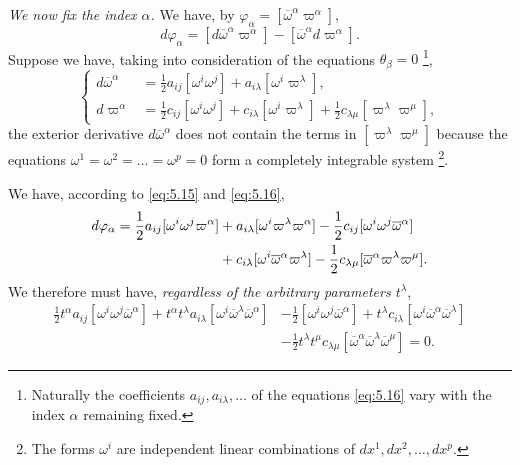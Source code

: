 \emph{We now fix the index $\alpha$.} We have, by $\varphi_{\alpha}=[\overline\omega^{\alpha}\varpi^{\alpha}]$,
\begin{equation}
  \label{eq:5.15}
  d\varphi_{\alpha}=[d\overline\omega^{\alpha}\varpi^{\alpha}]-[\overline\omega^{\alpha}d\varpi^{\alpha}].
\end{equation}
Suppose we have, taking into consideration of the equations $\theta_{\beta}=0$ \footnote{Naturally the coefficients $a_{ij},a_{i\lambda},\dots$ of the equations \eqref{eq:5.16} vary with the index $\alpha$ remaining fixed.},
\begin{equation}
  \label{eq:5.16}
  \left\{
    \begin{aligned}
      d\overline\omega^{\alpha}&=\frac{1}{2}a_{ij}[\omega^{i}\omega^{j}]+a_{i\lambda}[\omega^{i}\varpi^{\lambda}],\\
      d\varpi^{\alpha}&=\frac{1}{2}c_{ij}[\omega^{i}\omega^{j}]+c_{i\lambda}[\omega^{i}\varpi^{\lambda}]+\frac{1}{2}c_{\lambda\mu}[\varpi^{\lambda}\varpi^{\mu}],
    \end{aligned}
  \right.
\end{equation}
the exterior derivative $d\overline\omega^{\alpha}$ does not contain the terms in $[\varpi^{\lambda}\varpi^{\mu}]$ because the equations $\omega^{1}=\omega^{2}=\dots=\omega^{p}=0$ form a completely integrable system \footnote{The forms $\omega^{i}$ are independent linear combinations of $dx^{1},dx^{2},\dots,dx^{p}$.}.

We have, according to \eqref{eq:5.15} and \eqref{eq:5.16},
\begin{align}
  \label{eq:5.17}
  d\varphi_{\alpha}=\frac{1}{2}a_{ij}[\omega^{i}\omega^{j}\varpi^{\alpha}]&+a_{i\lambda}[\omega^{i}\varpi^{\lambda}\varpi^{\alpha}]-\frac{1}{2}c_{ij}[\omega^{i}\omega^{j}\overline\omega^{\alpha}]\\
  &+c_{i\lambda}[\omega^{i}\overline\omega^{\alpha}\varpi^{\lambda}]-\frac{1}{2}c_{\lambda\mu}[\overline\omega^{\alpha}\varpi^{\lambda}\varpi^{\mu}].\notag
\end{align}
We therefore must have, \emph{regardless of the arbitrary parameters $t^{\lambda}$},
\begin{align*}
  \frac{1}{2}t^{\alpha}a_{ij}[\omega^{i}\omega^{j}\overline\omega^{\alpha}]+t^{\alpha}t^{\lambda}a_{i\lambda}[\omega^{i}\overline\omega^{\lambda}\overline\omega^{\alpha}]&-\frac{1}{2}[\omega^{i}\omega^{j}\overline\omega^{\alpha}]+t^{\lambda}c_{i\lambda}[\omega^{i}\overline\omega^{\alpha}\overline\omega^{\lambda}]\\
&-\frac{1}{2}t^{\lambda}t^{\mu}c_{\lambda\mu}[\overline\omega^{\alpha}\overline\omega^{\lambda}\overline\omega^{\mu}]=0.
\end{align*}

